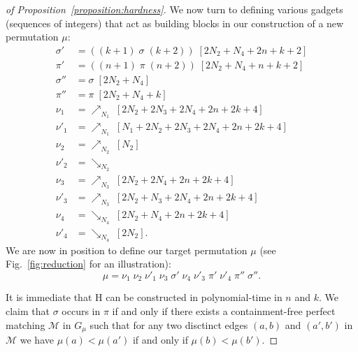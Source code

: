 \documentclass[a4paper]{llncs}
\begin{document}
\begin{proof}[of Proposition~\ref{proposition:hardness}]
  We now turn to defining various gadgets (sequences of integers)
  that act as building blocks in our construction of a new permutation $\mu$:
  \begin{align*}
  \sigma'  &= ((k+1) \; \sigma \; (k+2)) \; [2N_2 + N_4 + 2n + k + 2] \\
  \pi'     &= ((n+1) \; \pi \; (n+2)) \; [2N_2 + N_4 + n + k + 2] \\
  \sigma'' &= \sigma \; [2N_2 + N_4] \\
  \pi''    &= \pi \; [2N_2 + N_4 + k] \\
  \nu_1    &= \nearrow_{N_1} \; [2N_2 + 2N_3 + 2N_4 + 2n + 2k + 4] \\
  \nu'_1   &= \nearrow_{N_1} \; [N_1 + 2N_2 + 2N_3 + 2N_4 + 2n + 2k + 4] \\
  \nu_2    &= \nearrow_{N_2} \; [N_2] \\
  \nu'_2   &= \searrow_{N_2} \\
  \nu_3    &= \nearrow_{N_3} \; [2N_2 + 2N_4 + 2n + 2k + 4] \\
  \nu'_3   &= \nearrow_{N_3} \; [2N_2 + N_3 + 2N_4 + 2n + 2k + 4] \\
  \nu_4    &= \searrow_{N_4} \; [2N_2 + N_4 + 2n + 2k + 4] \\
  \nu'_4   &= \searrow_{N_4} \; [2N_2]\text{.}
  \end{align*}
  We are now in position to define our target permutation $\mu$
  (see Fig.~\ref{fig:reduction} for an illustration):
  $$
  \mu
  =
  \nu_1 \; \nu_2 \; \nu'_1 \; \nu_3 \; \sigma' \; \nu_4 \; \nu'_3 \; \pi' \; \nu'_4 \; \pi'' \; \sigma''
  \text{.}
  $$

  It is immediate that H can be constructed in polynomial-time in $n$ and $k$.
  We claim that $\sigma$ occurs in $\pi$ if and only if
  there exists a containment-free perfect matching
  $\mathcal{M}$ in $G_\mu$ such that
  for any two disctinct edges
  $(a, b)$ and $(a', b')$ in $\mathcal{M}$
  we have $\mu(a) < \mu(a')$ if and only if $\mu(b) < \mu(b')$.


\end{proof}
\end{document}
